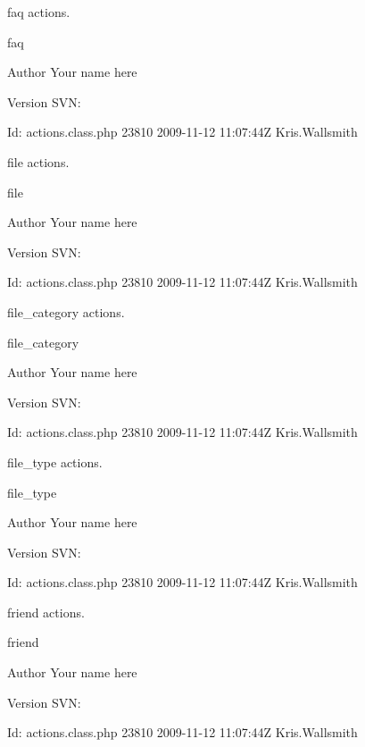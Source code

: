 faq actions.

faq \begin{DoxyAuthor}{Author}
Your name here 
\end{DoxyAuthor}
\begin{DoxyVersion}{Version}
S\-V\-N\-: 
\end{DoxyVersion}
\begin{DoxyParagraph}{Id\-:}
actions.\-class.\-php 23810 2009-\/11-\/12 11\-:07\-:44\-Z Kris.\-Wallsmith 
\end{DoxyParagraph}


file actions.

file \begin{DoxyAuthor}{Author}
Your name here 
\end{DoxyAuthor}
\begin{DoxyVersion}{Version}
S\-V\-N\-: 
\end{DoxyVersion}
\begin{DoxyParagraph}{Id\-:}
actions.\-class.\-php 23810 2009-\/11-\/12 11\-:07\-:44\-Z Kris.\-Wallsmith 
\end{DoxyParagraph}


file\-\_\-category actions.

file\-\_\-category \begin{DoxyAuthor}{Author}
Your name here 
\end{DoxyAuthor}
\begin{DoxyVersion}{Version}
S\-V\-N\-: 
\end{DoxyVersion}
\begin{DoxyParagraph}{Id\-:}
actions.\-class.\-php 23810 2009-\/11-\/12 11\-:07\-:44\-Z Kris.\-Wallsmith 
\end{DoxyParagraph}


file\-\_\-type actions.

file\-\_\-type \begin{DoxyAuthor}{Author}
Your name here 
\end{DoxyAuthor}
\begin{DoxyVersion}{Version}
S\-V\-N\-: 
\end{DoxyVersion}
\begin{DoxyParagraph}{Id\-:}
actions.\-class.\-php 23810 2009-\/11-\/12 11\-:07\-:44\-Z Kris.\-Wallsmith 
\end{DoxyParagraph}


friend actions.

friend \begin{DoxyAuthor}{Author}
Your name here 
\end{DoxyAuthor}
\begin{DoxyVersion}{Version}
S\-V\-N\-: 
\end{DoxyVersion}
\begin{DoxyParagraph}{Id\-:}
actions.\-class.\-php 23810 2009-\/11-\/12 11\-:07\-:44\-Z Kris.\-Wallsmith 
\end{DoxyParagraph}


